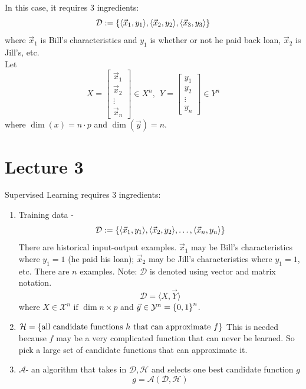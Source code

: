 \documentclass[12pt]{article}
\begin{document}
In this case, it requires $3$ ingredients: 
$$ \mathcal{D} := \left\{  \langle \vec{x}_1, y_1 \rangle, \langle \vec{x}_2, y_2 \rangle, \langle \vec{x}_3, y_3 \rangle \right\} $$ 
where $\vec{x}_1$ is Bill's characteristics and $y_1$ is whether or not he paid back loan, $\vec{x}_2$ is Jill's, etc. \\
Let $$X = \begin{bmatrix} \vec{x}_1 \\ \vec{x}_2 \\ \vdots \\ \vec{x}_n \end{bmatrix} \in X^n,~~ Y = \begin{bmatrix} y_1 \\ y_2 \\ \vdots \\ y_n \end{bmatrix} \in Y^n $$ 
where $\dim(x) = n \cdot p$ and $\dim(\vec{y}) = n$.

\section{Lecture 3} 
Supervised Learning requires $3$ ingredients: \begin{enumerate} 
\item Training data - $$ \mathcal{D} := \left\{  \langle \vec{x}_1, y_1 \rangle, \langle \vec{x}_2, y_2 \rangle, \dots, \langle \vec{x}_n, y_n \rangle \right\} $$ There are historical input-output examples. $\vec{x}_1$ may be Bill's characteristics where $y_1 = 1$ (he paid his loan); $\vec{x}_2$ may be Jill's characteristics where $y_1 = 1$, etc. There are $n$ examples. Note: $\mathcal{D}$ is denoted using vector and matrix notation. $$ \mathcal{D} = \langle X, \vec{Y} \rangle $$ where $X \in \mathcal{X}^n \text{ if } \dim n \times p$ and $\vec{y} \in \mathcal{Y}^n = \left\{ 0,1 \right\}^n$. 
\item $\mathcal{H} = \left\{ \text{all candidate functions } h \text{ that can approximate } f \right\}$ This is needed because $f$ may be a very complicated function that can never be learned. So pick a large set of candidate functions that can approximate it. 
\item $\mathcal{A}$- an algorithm that takes in $\mathcal{D},\mathcal{H}$ and selects one best candidate function $g$ $$g = \mathcal{A}(\mathcal{D},\mathcal{H})$$ \end{enumerate} 
\end{document}
